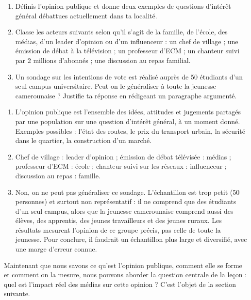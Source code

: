 \documentclass[11pt]{article}
\begin{document}
\begin{exercice}
\begin{enumerate}
\item Définis l'opinion publique et donne deux exemples de questions d'intérêt général débattues actuellement dans ta localité.
\item Classe les acteurs suivants selon qu'il s'agit de la famille, de l'école, des médias, d'un leader d'opinion ou d'un influenceur : un chef de village ; une émission de débat à la télévision ; un professeur d'ECM ; un chanteur suivi par 2 millions d'abonnés ; une discussion au repas familial.
\item Un sondage sur les intentions de vote est réalisé auprès de 50 étudiants d'un seul campus universitaire. Peut-on le généraliser à toute la jeunesse camerounaise ? Justifie ta réponse en rédigeant un paragraphe argumenté.
\end{enumerate}
\end{exercice}

\begin{corrige}
\begin{enumerate}
\item L'opinion publique est l'ensemble des idées, attitudes et jugements partagés par une population sur une question d'intérêt général, à un moment donné. Exemples possibles : l'état des routes, le prix du transport urbain, la sécurité dans le quartier, la construction d'un marché.
\item Chef de village : leader d'opinion ; émission de débat télévisée : médias ; professeur d'ECM : école ; chanteur suivi sur les réseaux : influenceur ; discussion au repas : famille.
\item Non, on ne peut pas généraliser ce sondage. L'échantillon est trop petit (50 personnes) et surtout non représentatif : il ne comprend que des étudiants d'un seul campus, alors que la jeunesse camerounaise comprend aussi des élèves, des apprentis, des jeunes travailleurs et des jeunes ruraux. Les résultats mesurent l'opinion de ce groupe précis, pas celle de toute la jeunesse. Pour conclure, il faudrait un échantillon plus large et diversifié, avec une marge d'erreur connue.
\end{enumerate}
\end{corrige}

Maintenant que nous savons ce qu'est l'opinion publique, comment elle se forme et comment on la mesure, nous pouvons aborder la question centrale de la leçon : quel est l'impact réel des médias sur cette opinion ? C'est l'objet de la section suivante.
\end{document}
